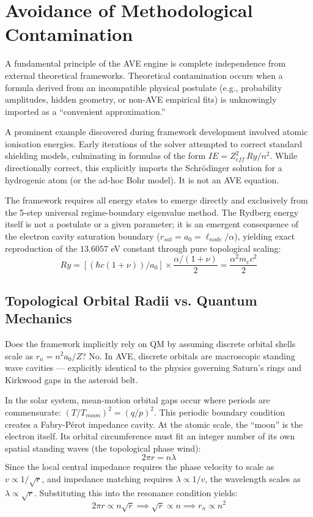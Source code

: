 \section{Avoidance of Methodological Contamination}
\label{sec:methodological_contamination}

A fundamental principle of the AVE engine is complete independence from external theoretical frameworks. Theoretical contamination occurs when a formula derived from an incompatible physical postulate (e.g., probability amplitudes, hidden geometry, or non-AVE empirical fits) is unknowingly imported as a ``convenient approximation.''

A prominent example discovered during framework development involved atomic ionisation energies. Early iterations of the solver attempted to correct standard shielding models, culminating in formulas of the form $IE = Z_{eff}^2 \, Ry / n^2$. While directionally correct, this explicitly imports the Schrödinger solution for a hydrogenic atom (or the ad-hoc Bohr model). It is not an AVE equation.

The framework requires all energy states to emerge directly and exclusively from the 5-step universal regime-boundary eigenvalue method. The Rydberg energy itself is not a postulate or a given parameter; it is an emergent consequence of the electron cavity saturation boundary ($r_{sat} = a_0 = \ell_{node}/\alpha$), yielding exact reproduction of the $13.6057$ eV constant through pure topological scaling:
\begin{equation}
    Ry = \left[ (\hbar c(1+\nu)) / a_0 \right] \times \frac{\alpha/(1+\nu)}{2} = \frac{\alpha^2 m_e c^2}{2}
\end{equation}

\subsection{Topological Orbital Radii vs. Quantum Mechanics}
Does the framework implicitly rely on QM by assuming discrete orbital shells scale as $r_n = n^2 a_0 / Z$? No. In AVE, discrete orbitals are macroscopic standing wave cavities — explicitly identical to the physics governing Saturn's rings and Kirkwood gaps in the asteroid belt. 

In the solar system, mean-motion orbital gaps occur where periods are commensurate: $(T/T_{moon})^2 = (q/p)^2$. This periodic boundary condition creates a Fabry-Pérot impedance cavity. At the atomic scale, the ``moon'' is the electron itself. Its orbital circumference must fit an integer number of its own spatial standing waves (the topological phase wind):
\begin{equation}
    2\pi r = n \lambda
\end{equation}
Since the local central impedance requires the phase velocity to scale as $v \propto 1/\sqrt{r}$, and impedance matching requires $\lambda \propto 1/v$, the wavelength scales as $\lambda \propto \sqrt{r}$. Substituting this into the resonance condition yields:
\begin{equation}
    2\pi r \propto n \sqrt{r} \implies \sqrt{r} \propto n \implies r_n \propto n^2
\end{equation}

